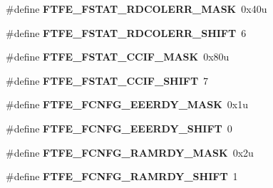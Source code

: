 \begin{DoxyCompactItemize}
\item 
\#define {\bfseries F\+T\+F\+E\+\_\+\+F\+S\+T\+A\+T\+\_\+\+R\+D\+C\+O\+L\+E\+R\+R\+\_\+\+M\+A\+SK}~0x40u\hypertarget{group__FTFE__Register__Masks_ga2b7a9107390c7761ae8c4d5a4f8941af}{}\label{group__FTFE__Register__Masks_ga2b7a9107390c7761ae8c4d5a4f8941af}

\item 
\#define {\bfseries F\+T\+F\+E\+\_\+\+F\+S\+T\+A\+T\+\_\+\+R\+D\+C\+O\+L\+E\+R\+R\+\_\+\+S\+H\+I\+FT}~6\hypertarget{group__FTFE__Register__Masks_ga434a96f6b56c1c08f0f8c9e8c50ed9a8}{}\label{group__FTFE__Register__Masks_ga434a96f6b56c1c08f0f8c9e8c50ed9a8}

\item 
\#define {\bfseries F\+T\+F\+E\+\_\+\+F\+S\+T\+A\+T\+\_\+\+C\+C\+I\+F\+\_\+\+M\+A\+SK}~0x80u\hypertarget{group__FTFE__Register__Masks_gab1b2afd287fd5012f586840b391110a9}{}\label{group__FTFE__Register__Masks_gab1b2afd287fd5012f586840b391110a9}

\item 
\#define {\bfseries F\+T\+F\+E\+\_\+\+F\+S\+T\+A\+T\+\_\+\+C\+C\+I\+F\+\_\+\+S\+H\+I\+FT}~7\hypertarget{group__FTFE__Register__Masks_gac879e7876e19c43bd3d04bc1272e1be5}{}\label{group__FTFE__Register__Masks_gac879e7876e19c43bd3d04bc1272e1be5}

\item 
\#define {\bfseries F\+T\+F\+E\+\_\+\+F\+C\+N\+F\+G\+\_\+\+E\+E\+E\+R\+D\+Y\+\_\+\+M\+A\+SK}~0x1u\hypertarget{group__FTFE__Register__Masks_gabd7f0b0695b1e55349fef4587df62034}{}\label{group__FTFE__Register__Masks_gabd7f0b0695b1e55349fef4587df62034}

\item 
\#define {\bfseries F\+T\+F\+E\+\_\+\+F\+C\+N\+F\+G\+\_\+\+E\+E\+E\+R\+D\+Y\+\_\+\+S\+H\+I\+FT}~0\hypertarget{group__FTFE__Register__Masks_ga9587828c6c069eca8571ac30f362db64}{}\label{group__FTFE__Register__Masks_ga9587828c6c069eca8571ac30f362db64}

\item 
\#define {\bfseries F\+T\+F\+E\+\_\+\+F\+C\+N\+F\+G\+\_\+\+R\+A\+M\+R\+D\+Y\+\_\+\+M\+A\+SK}~0x2u\hypertarget{group__FTFE__Register__Masks_gabfae504593e38f672188b415d986d4d3}{}\label{group__FTFE__Register__Masks_gabfae504593e38f672188b415d986d4d3}

\item 
\#define {\bfseries F\+T\+F\+E\+\_\+\+F\+C\+N\+F\+G\+\_\+\+R\+A\+M\+R\+D\+Y\+\_\+\+S\+H\+I\+FT}~1\hypertarget{group__FTFE__Register__Masks_ga112f1ba27f929163498d8ba3f6fb6fdc}{}\label{group__FTFE__Register__Masks_ga112f1ba27f929163498d8ba3f6fb6fdc}


\end{DoxyCompactItemize}
